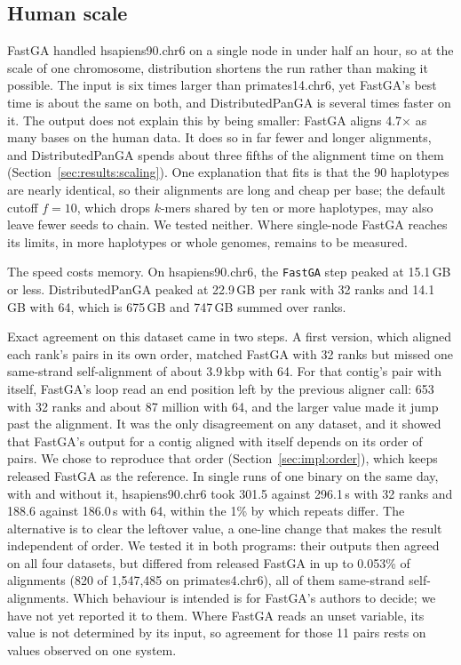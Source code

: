 \subsection{Human scale}\label{sec:disc:human}

FastGA handled hsapiens90.chr6 on a single node in under half an hour, so at
the scale of one chromosome, distribution shortens the run rather than
making it possible. The input is six times larger than primates14.chr6, yet
FastGA's best time is about the same on both, and DistributedPanGA is
several times faster on it. The output does not explain this by being
smaller: FastGA aligns 4.7$\times$ as many bases on the human data. It does
so in far fewer and longer alignments, and DistributedPanGA spends about
three fifths of the alignment time on them (Section~\ref{sec:results:scaling}). One
explanation that fits is that the 90 haplotypes are nearly identical, so
their alignments are long and cheap per base; the default cutoff $f=10$,
which drops $k$-mers shared by ten or more haplotypes, may also leave fewer
seeds to chain. We tested neither. Where single-node FastGA reaches its
limits, in more haplotypes or whole genomes, remains to be measured.

The speed costs memory. On hsapiens90.chr6, the \texttt{FastGA} step peaked
at 15.1\,GB or less. DistributedPanGA peaked at 22.9\,GB per rank with 32 ranks and
14.1\,GB with 64, which is 675\,GB and 747\,GB summed over ranks.

Exact agreement on this dataset came in two steps. A first version, which
aligned each rank's pairs in its own order, matched FastGA with 32 ranks
but missed one same-strand self-alignment of about 3.9\,kbp with 64. For
that contig's pair with itself, FastGA's loop read an end position left by
the previous aligner call: 653 with 32 ranks and about 87 million with 64,
and the larger value made it jump past the alignment. It was the only
disagreement on any dataset, and it showed that FastGA's output for a
contig aligned with itself depends on its order of pairs. We chose to
reproduce that order (Section~\ref{sec:impl:order}), which keeps released
FastGA as the reference. In single runs of one binary on the same day,
with and without it, hsapiens90.chr6 took 301.5 against 296.1\,s with 32
ranks and 188.6 against 186.0\,s with 64, within the 1\% by which repeats
differ. The alternative is to clear the leftover value, a one-line change
that makes the result independent of order. We tested it in both programs: their
outputs then agreed on all four datasets, but differed from released
FastGA in up to 0.053\% of alignments (820 of 1,547,485 on primates4.chr6),
all of them same-strand self-alignments. Which behaviour is intended is for
FastGA's authors to decide; we have not yet reported it to them. Where
FastGA reads an unset variable, its value is not determined by its input,
so agreement for those 11 pairs rests on values observed on one system.
